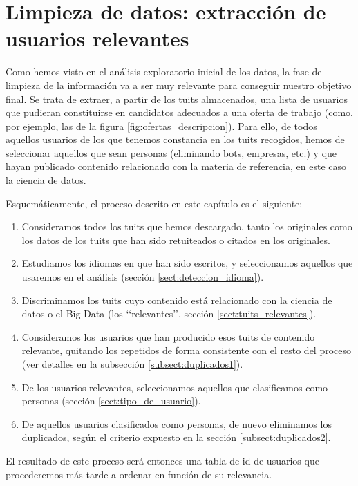 
\chapter{Limpieza de datos: extracción de usuarios relevantes}
\label{chap:extraccion_de_usuarios}

Como hemos visto en el análisis exploratorio inicial de los datos, la fase 
de limpieza de la información va a ser muy relevante para conseguir
nuestro objetivo final. Se trata de extraer, a partir de los tuits almacenados, 
una lista de usuarios que pudieran constituirse en candidatos adecuados a 
una oferta de trabajo (como, por ejemplo, las de la figura \ref{fig:ofertas_descripcion}). 
Para ello, de todos aquellos usuarios de los que tenemos constancia en 
los tuits recogidos, hemos de seleccionar aquellos que sean personas (eliminando bots, 
empresas, etc.) y que hayan publicado contenido relacionado con la materia de referencia, 
en este caso la ciencia de datos.

Esquemáticamente, el proceso descrito en este capítulo es el siguiente:
\begin{enumerate}
\item Consideramos todos los tuits que hemos descargado, tanto los originales como los datos de los tuits que han sido retuiteados o citados en los originales.
\item Estudiamos los idiomas en que han sido escritos, y seleccionamos aquellos que usaremos en el 
análisis (sección \ref{sect:deteccion_idioma}).
\item Discriminamos los tuits cuyo contenido está relacionado con la ciencia de datos o el Big Data (los \lq\lq relevantes\rq\rq,  sección \ref{sect:tuits_relevantes}).
\item Consideramos los usuarios que han producido esos tuits de contenido relevante, quitando los repetidos
de forma consistente con el resto del proceso (ver detalles en la subsección \ref{subsect:duplicados1}). 
\item De los usuarios relevantes, seleccionamos aquellos que clasificamos como personas (sección 
\ref{sect:tipo_de_usuario}).
\item De aquellos usuarios clasificados como personas, de nuevo eliminamos los duplicados,
según el criterio expuesto en la sección \ref{subsect:duplicados2}.
\end{enumerate}

El resultado de este proceso será entonces una tabla de id de usuarios que procederemos más tarde
a ordenar en función de su relevancia.

